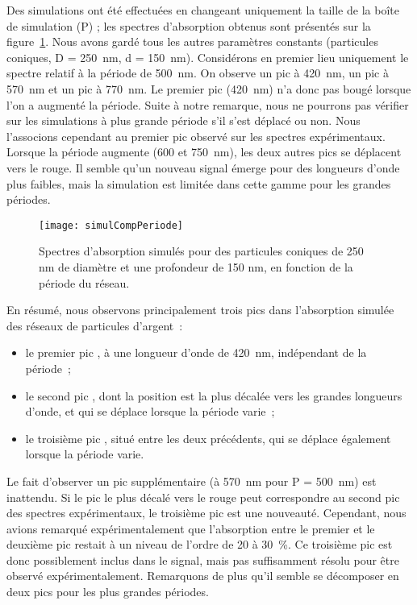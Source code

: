 Des simulations ont été effectuées en changeant uniquement la taille de la boîte de simulation (P) ; les spectres d'absorption obtenus sont présentés sur la figure~\ref{simulCompPeriode}. Nous avons gardé tous les autres paramètres constants (particules coniques, D = 250~nm, d = 150~nm). Considérons en premier lieu uniquement le spectre relatif à la période de 500~nm. On observe un pic à 420~nm, un pic à 570~nm et un pic à 770~nm. Le premier pic (420~nm) n'a donc pas bougé lorsque l'on a augmenté la période. Suite à notre remarque, nous ne pourrons pas vérifier sur les simulations à plus grande période s'il s'est déplacé ou non. Nous l'associons cependant au \og premier pic \fg{} observé sur les spectres expérimentaux. Lorsque la période augmente (600 et 750~nm), les deux autres pics se déplacent vers le rouge. Il semble qu'un nouveau signal émerge pour des longueurs d'onde plus faibles, mais la simulation est limitée dans cette gamme pour les grandes périodes.\par 
\begin{figure}[!htb]
\centering
\texttt{[image: simulCompPeriode]}
\caption{Spectres d'absorption simulés pour des particules coniques de 250 nm de diamètre et une profondeur de 150 nm, en fonction de la période du réseau.}
\label{simulCompPeriode}
\end{figure}
En résumé, nous observons principalement trois pics dans l'absorption simulée des réseaux de particules d'argent~:
\begin{itemize}
\item le \og premier pic \fg, à une longueur d'onde de 420~nm, indépendant de la période~;
\item le \og second pic \fg, dont la position est la plus décalée vers les grandes longueurs d'onde, et qui se déplace lorsque la période varie~;
\item le \og troisième pic \fg, situé entre les deux précédents, qui se déplace également lorsque la période varie. 
\end{itemize}
Le fait d'observer un pic supplémentaire (à 570~nm pour P = 500~nm) est inattendu. Si le pic le plus décalé vers le rouge peut correspondre au \og second pic \fg{} des spectres expérimentaux, le \og troisième pic \fg{} est une nouveauté. Cependant, nous avions remarqué expérimentalement que l'absorption entre le premier et le deuxième pic restait à un niveau de l'ordre de 20 à 30~\%. Ce troisième pic est donc possiblement inclus dans le signal, mais pas suffisamment résolu pour être observé expérimentalement. Remarquons de plus qu'il semble se décomposer en deux pics pour les plus grandes périodes.\par
